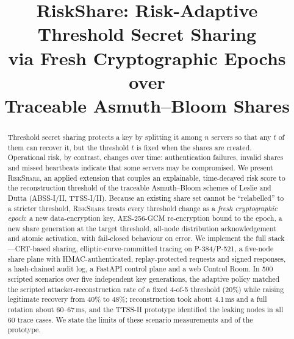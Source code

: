 \documentclass[conference]{IEEEtran}
\newcommand{\RS}{\textsc{RiskShare}}
\begin{document}
\title{RiskShare: Risk-Adaptive Threshold Secret Sharing\\ via Fresh Cryptographic Epochs over\\ Traceable Asmuth--Bloom Shares}

\author{
\and
{}
}

\maketitle

\begin{abstract}
Threshold secret sharing protects a key by splitting it among $n$ servers so that any $t$ of them can recover it, but the threshold $t$ is fixed when the shares are created. Operational risk, by contrast, changes over time: authentication failures, invalid shares and missed heartbeats indicate that some servers may be compromised. We present \RS{}, an applied extension that couples an explainable, time-decayed risk score to the reconstruction threshold of the traceable Asmuth--Bloom schemes of Leslie and Dutta (ABSS-I/II, TTSS-I/II). Because an existing share set cannot be ``relabelled'' to a stricter threshold, \RS{} treats every threshold change as a \emph{fresh cryptographic epoch}: a new data-encryption key, AES-256-GCM re-encryption bound to the epoch, a new share generation at the target threshold, all-node distribution acknowledgement and atomic activation, with fail-closed behaviour on error. We implement the full stack---CRT-based sharing, elliptic-curve-committed tracing on P-384/P-521, a five-node share plane with HMAC-authenticated, replay-protected requests and signed responses, a hash-chained audit log, a FastAPI control plane and a web Control Room. In 500 scripted scenarios over five independent key generations, the adaptive policy matched the scripted attacker-reconstruction rate of a fixed 4-of-5 threshold (20\%) while raising legitimate recovery from 40\% to 48\%; reconstruction took about 4.1\,ms and a full rotation about 60--67\,ms, and the TTSS-II prototype identified the leaking nodes in all 60 trace cases. We state the limits of these scenario measurements and of the prototype.
\end{abstract}
\end{document}
